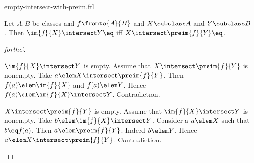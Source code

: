 \documentclass{naproche-library}
\begin{document}
\begin{smodule}[title=Empty Intersections with Preimages]{empty-intersect-with-preim.ftl}


\begin{proposition}[forthel,id=EmptyIntersectWithImAndPreimProp]
  Let $A, B$ be classes and $f \fromto{A}{B}$ and $X \subclass A$ and $Y \subclass B$.
  Then $\im{f}{X} \intersect Y \eq \empty$ iff $X \intersect \preim{f}{Y} \eq \empty$.
\end{proposition}
\begin{proof}[forthel]
  \begin{case}{$\im{f}{X} \intersect Y$ is empty.}
    Assume that $X \intersect \preim{f}{Y}$ is nonempty.
    Take $a \elem X \intersect \preim{f}{Y}$.
    Then $f(a) \elem \im{f}{X}$ and $f(a) \elem Y$.
    Hence $f(a) \elem \im{f}{X} \intersect Y$.
    Contradiction.
  \end{case}

  \begin{case}{$X \intersect \preim{f}{Y}$ is empty.}
    Assume that $\im{f}{X} \intersect Y$ is nonempty.
    Take $b \elem \im{f}{X} \intersect Y$.
    Consider a $a \elem X$ such that $b \eq f(a)$.
    Then $a \elem \preim{f}{Y}$.
    Indeed $b \elem Y$.
    Hence $a \elem X \intersect \preim{f}{Y}$.
    Contradiction.
  \end{case}
\end{proof}

\end{smodule}
\end{document}
